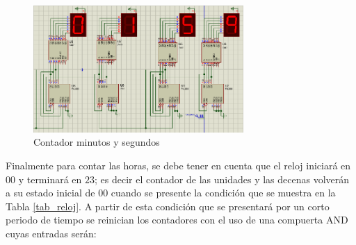 \begin{figure}[h]
    \begin{center}
    \includegraphics[width=8cm]{images/image7.png}
    \newline
    \caption{Contador minutos y segundos}\label{cont_hs}
    \end{center}
\end{figure}
\newline
Finalmente para contar las horas, se debe tener en cuenta que el reloj iniciará en $00$ y terminará en $23$; es decir el contador de las unidades y las decenas volverán a su estado inicial de $00$ cuando se presente la condición que se muestra en la Tabla \ref{tab_reloj}. A partir de esta condición que se presentará por un corto periodo de tiempo se reinician los contadores con el uso de una compuerta AND cuyas entradas serán:
\newline
